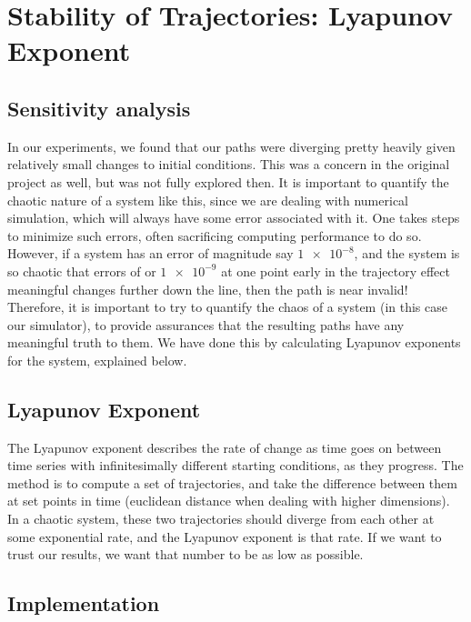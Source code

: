 \section{Stability of Trajectories: Lyapunov Exponent}
\subsection{Sensitivity analysis}

In our experiments, we found that our paths were diverging pretty heavily given relatively small changes to initial conditions. This was a concern in the original project as well, but was not fully explored then. It is important to quantify the chaotic nature of a system like this, since we are dealing with numerical simulation, which will always have some error associated with it. One takes steps to minimize such errors, often sacrificing computing performance to do so. However, if a system has an error of magnitude say \(\num{1e-8}\), and the system is so chaotic that errors of or \(\num{1e-9}\) at one point early in the trajectory effect meaningful changes further down the line, then the path is near invalid! Therefore, it is important to try to quantify the chaos of a system (in this case our simulator), to provide assurances that the resulting paths have any meaningful truth to them. We have done this by calculating Lyapunov exponents for the system, explained below.

\subsection{Lyapunov Exponent}

The Lyapunov exponent describes the rate of change as time goes on between time series with infinitesimally different starting conditions, as they progress. The method is to compute a set of trajectories, and take the difference between them at set points in time (euclidean distance when dealing with higher dimensions). In a chaotic system, these two trajectories should diverge from each other at some exponential rate, and the Lyapunov exponent is that rate. If we want to trust our results, we want that number to be as low as possible. 

\subsection{Implementation}

